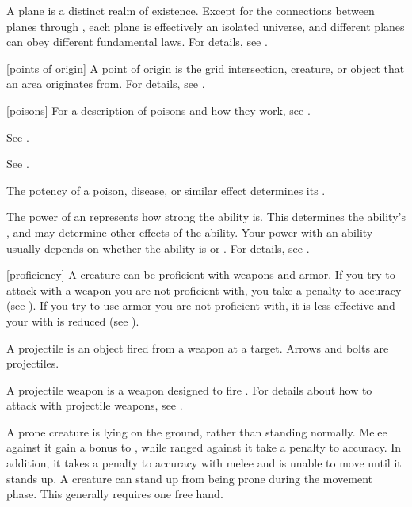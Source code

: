  A plane is a distinct realm of existence.
Except for the connections between planes through , each plane is effectively an isolated universe, and different planes can obey different fundamental laws.
For details, see .

[points of origin] A point of origin is the grid intersection, creature, or object that an area originates from.
For details, see .

[poisons] For a description of poisons and how they work, see .

 See .

 See .

 The potency of a poison, disease, or similar effect determines its .

 The power of an  represents how strong the ability is.
This determines the ability's , and may determine other effects of the ability.
Your power with an ability usually depends on whether the ability is  or .
For details, see .

[proficiency] A creature can be proficient with weapons and armor.
If you try to attack with a weapon you are not proficient with, you take a  penalty to accuracy (see ).
If you try to use armor you are not proficient with, it is less effective and your  with  is reduced (see ).

 A projectile is an object fired from a weapon at a target.
Arrows and bolts are projectiles.

 A projectile weapon is a weapon designed to fire .
For details about how to attack with projectile weapons, see .

 A prone creature is lying on the ground, rather than standing normally.
Melee  against it gain a  bonus to , while ranged  against it take a  penalty to accuracy.
In addition, it takes a  penalty to accuracy with melee  and is unable to move until it stands up.
A creature can stand up from being prone during the movement phase.
This generally requires one free hand.

